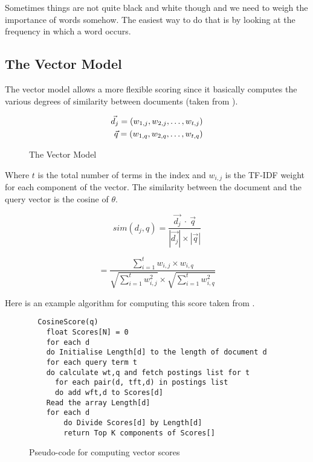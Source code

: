 Sometimes things are not quite black and white though and we need to weigh the importance of words somehow. The easiest way to do that is by looking at the frequency in which a word occurs.

\subsection*{The Vector Model}

The vector model allows a more flexible scoring since it basically computes the various degrees of similarity between documents (taken from \citep[p.78]{Baeza-Yates2011}).

\begin{align}
  \vec{d_j} = (w_{1,j}, w_{2,j}, \ldots, w_{t,j})\notag\\
  \vec{q} = (w_{1,q}, w_{2,q}, \ldots, w_{t,q})
\end{align}

\begin{figure}[!htbp] %
  \centering
\caption[Vector Model]{The Vector Model}
\label{fig:VM}
\end{figure}

Where $t$ is the total number of terms in the index and $w_{i,j}$ is the TF-IDF weight for each component of the vector. The similarity between the document and the query vector is the cosine of $\theta$.

\begin{equation}
  sim(d_j,q) = \frac{\vec{d_j} \ \cdot \ \vec{q}}{|\vec{d_j}| \times |\vec{q}|}
\end{equation}

\begin{equation}
  = \frac{\sum_{i=1}^{t}w_{i,j} \times w_{i,q}}
  {\sqrt{\sum_{i=1}^{t}w_{i,j}^{2}} \times \sqrt{\sum_{i=1}^{t}w_{i,q}^{2}}}
\end{equation}

Here is an example algorithm for computing this score taken from \citep[p.125]{Manning2009}.

\begin{figure}
  \begin{lstlisting}
  CosineScore(q)
    float Scores[N] = 0
    for each d
    do Initialise Length[d] to the length of document d
    for each query term t
    do calculate wt,q and fetch postings list for t
      for each pair(d, tft,d) in postings list
      do add wft,d to Scores[d]
    Read the array Length[d]
    for each d
    	do Divide Scores[d] by Length[d]
    	return Top K components of Scores[]
  \end{lstlisting}
\caption[Pseudo-code for computing vector scores]{Pseudo-code for computing vector scores}
\label{fig:VectorScores}
\end{figure}

